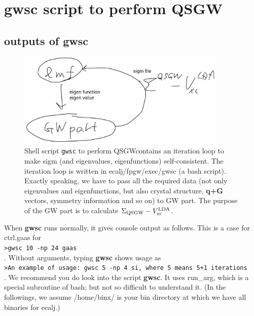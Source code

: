 \documentclass[a4paper,10pt,epsf,fleqn]{article}
\def\QSGW{QS{GW}}
\newcommand{\exe}[1]{{\bf #1}}
\newcommand{\io}[1]{{\sf  #1}}
\begin{document}
\section{gwsc script to perform QSGW}
\label{gwsc}

\subsection{outputs of \exe{gwsc}}

\begin{figure}[h]
\includegraphics[width=10cm]{gwsc2014-12-091.eps}
\caption[]{Shell script {\tt gwsc} to perform \QSGW contains 
an iteration loop to make sigm (and eigenvalues, eigenfunctions)
self-consistent. The iteration loop is written in 
ecalj/fpgw/exec/gwsc (a bash script). 
Exactly speaking, we have to pass all the required data 
(not only eigenvalues and eigenfunctions, but also 
crystal structure, {\bf q+G} vectors, symmetry information and so on) to GW part.
The purpose of the GW part is to calculate $\Sigma_{\rm QSGW}-V_{\rm xc}^{\rm LDA}$.}
\label{gwscpicture}
\end{figure}

When \exe{gwsc} runs normally, it gives console output as follows.
This is a case for \io{ctrl.gaas} for\\
\verb#>gwsc 10 -np 24 gaas#\\
. Without arguments, typing \exe{gwsc} shows usage as \\
\verb#>An example of usage: gwsc 5 -np 4 si, where 5 means 5+1 iterations#\\
. We recommend you do look into the script \exe{gwsc}. 
It uses \io{run\_arg}, which is a special
subroutine of bash; but not so difficult to understand it.
(In the followings, we assume \io{/home/binx/} is your bin directory 
at which we have all binaries for ecalj.)
\end{document}
